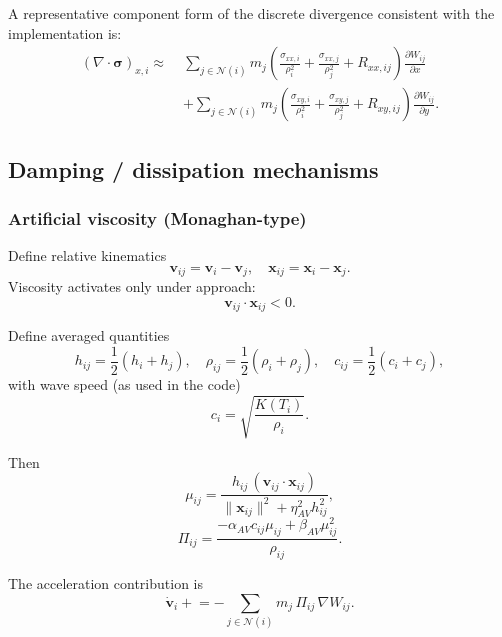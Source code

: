 \documentclass[11pt]{article}
\begin{document}
A representative component form of the discrete divergence consistent with the implementation is:
\begin{align}
(\nabla\cdot \bm{\sigma})_{x,i}\approx\;&
\sum_{j\in\mathcal{N}(i)} m_j\left(
\frac{\sigma_{xx,i}}{\rho_i^2}+\frac{\sigma_{xx,j}}{\rho_j^2}+R_{xx,ij}
\right)\frac{\partial W_{ij}}{\partial x}
\nonumber\\
&+
\sum_{j\in\mathcal{N}(i)} m_j\left(
\frac{\sigma_{xy,i}}{\rho_i^2}+\frac{\sigma_{xy,j}}{\rho_j^2}+R_{xy,ij}
\right)\frac{\partial W_{ij}}{\partial y}.
\label{eq:stress_div_x}
\end{align}

\subsection{Damping / dissipation mechanisms}

\subsubsection{Artificial viscosity (Monaghan-type)}

Define relative kinematics
\begin{equation}
\bm{v}_{ij}=\bm{v}_i-\bm{v}_j,\quad \bm{x}_{ij}=\bm{x}_i-\bm{x}_j.
\label{eq:rel_kin}
\end{equation}
Viscosity activates only under approach:
\begin{equation}
\bm{v}_{ij}\cdot\bm{x}_{ij}<0.
\label{eq:approach}
\end{equation}

Define averaged quantities
\begin{equation}
h_{ij}=\frac12(h_i+h_j),\quad \rho_{ij}=\frac12(\rho_i+\rho_j),\quad c_{ij}=\frac12(c_i+c_j),
\label{eq:avg}
\end{equation}
with wave speed (as used in the code)
\begin{equation}
c_i=\sqrt{\frac{K(T_i)}{\rho_i}}.
\label{eq:ci}
\end{equation}

Then
\begin{equation}
\mu_{ij}=\frac{h_{ij}\,(\bm{v}_{ij}\cdot\bm{x}_{ij})}{\|\bm{x}_{ij}\|^2+\eta_{AV}^2 h_{ij}^2},
\label{eq:muij}
\end{equation}
\begin{equation}
\Pi_{ij}=\frac{-\alpha_{AV}c_{ij}\mu_{ij}+\beta_{AV}\mu_{ij}^2}{\rho_{ij}}.
\label{eq:piij}
\end{equation}

The acceleration contribution is
\begin{equation}
\dot{\bm{v}}_i \mathrel{+}= -\sum_{j\in\mathcal{N}(i)} m_j\,\Pi_{ij}\,\nabla W_{ij}.
\label{eq:av_accel}
\end{equation}
\end{document}
